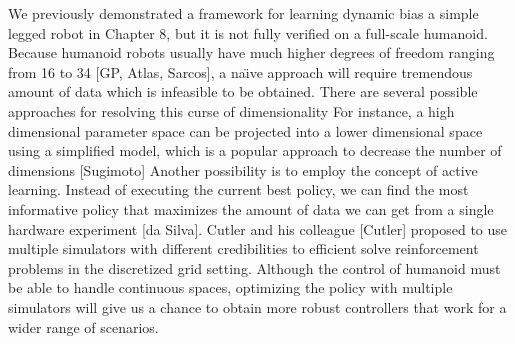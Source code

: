 We previously demonstrated a framework for learning dynamic bias
a simple legged robot in Chapter 8, but it is not fully verified on a
full-scale humanoid.
Because humanoid robots usually have much higher degrees of freedom ranging
from 16 to 34 [GP, Atlas, Sarcos], a na\"{\i}ve approach will require
tremendous amount of data which is infeasible to be obtained.
There are several possible approaches for resolving this curse of
dimensionality
For instance, a high dimensional parameter space can be projected into a lower
dimensional space using a simplified model, which is a popular approach to
decrease the number of dimensions [Sugimoto]
Another possibility is to employ the concept of active learning.
Instead of executing the current best policy, we can find the most
informative policy that maximizes the amount of data we can get from a
single hardware experiment [da Silva].
Cutler and his colleague [Cutler] proposed to use multiple simulators with
different credibilities to efficient solve reinforcement problems in the
discretized grid setting.
Although the control of humanoid must be able to handle continuous spaces,
optimizing the policy with multiple simulators will give us a chance to obtain
more robust controllers that work for a wider range of scenarios.














